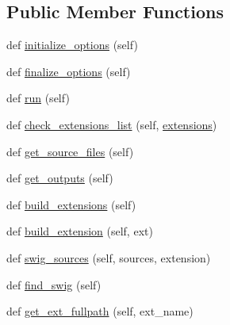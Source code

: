 \subsection*{Public Member Functions}
\begin{DoxyCompactItemize}
\item 
def \hyperlink{classsetuptools_1_1__distutils_1_1command_1_1build__ext_1_1build__ext_a554aaf515b2dbb5acce4748249104d4d}{initialize\+\_\+options} (self)
\item 
def \hyperlink{classsetuptools_1_1__distutils_1_1command_1_1build__ext_1_1build__ext_ac37e44017ecb8c528a10df9bbffcf130}{finalize\+\_\+options} (self)
\item 
def \hyperlink{classsetuptools_1_1__distutils_1_1command_1_1build__ext_1_1build__ext_a95c9af7afdca3f4d104a3ce249f56de1}{run} (self)
\item 
def \hyperlink{classsetuptools_1_1__distutils_1_1command_1_1build__ext_1_1build__ext_a79ecad56ae370463ad1421e98f95d63f}{check\+\_\+extensions\+\_\+list} (self, \hyperlink{classsetuptools_1_1__distutils_1_1command_1_1build__ext_1_1build__ext_a241b3fb287879ddc63c20ee9fe2216c1}{extensions})
\item 
def \hyperlink{classsetuptools_1_1__distutils_1_1command_1_1build__ext_1_1build__ext_a0641a8c76320b98eb42963657aa273b5}{get\+\_\+source\+\_\+files} (self)
\item 
def \hyperlink{classsetuptools_1_1__distutils_1_1command_1_1build__ext_1_1build__ext_a135f56c739c5ef1325851c6252c70888}{get\+\_\+outputs} (self)
\item 
def \hyperlink{classsetuptools_1_1__distutils_1_1command_1_1build__ext_1_1build__ext_a8082c90e29bb8c071df75df44b733fa4}{build\+\_\+extensions} (self)
\item 
def \hyperlink{classsetuptools_1_1__distutils_1_1command_1_1build__ext_1_1build__ext_a30e4b74b5abc9049d3f6abcf4280204d}{build\+\_\+extension} (self, ext)
\item 
def \hyperlink{classsetuptools_1_1__distutils_1_1command_1_1build__ext_1_1build__ext_a72ad0c0f88bd388a71dabe4f8823ab68}{swig\+\_\+sources} (self, sources, extension)
\item 
def \hyperlink{classsetuptools_1_1__distutils_1_1command_1_1build__ext_1_1build__ext_a3f5a739c5017d50574c3a2f3e9d3c0c1}{find\+\_\+swig} (self)
\item 
def \hyperlink{classsetuptools_1_1__distutils_1_1command_1_1build__ext_1_1build__ext_a1e619afeaa4594ee0c43f39990dd4216}{get\+\_\+ext\+\_\+fullpath} (self, ext\+\_\+name)
\item 

\end{DoxyCompactItemize}
